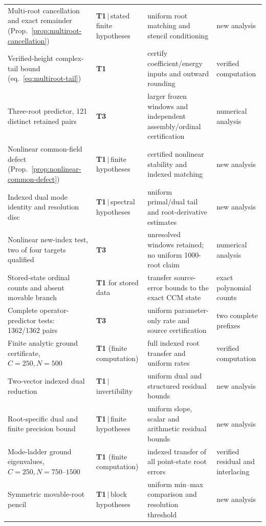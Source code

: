 \documentclass[11pt,a4paper]{article}
\begin{document}
{\begin{longtable}{@{}p{4.6cm} p{2.7cm} p{4.6cm} p{2.4cm}@{}}
Multi-root cancellation and exact remainder (Prop.~\ref{prop:multiroot-cancellation}) & \textbf{T1}$\,|\,$stated finite hypotheses & uniform root matching and stencil conditioning & new analysis \\
Verified-height complex-tail bound (eq.~\eqref{eq:multiroot-tail}) & \textbf{T1} & certify coefficient/energy inputs and outward rounding & verified computation \\
Three-root predictor, 121 distinct retained pairs & \textbf{T3} & larger frozen windows and independent assembly/ordinal certification & numerical analysis \\
Nonlinear common-field defect (Prop.~\ref{prop:nonlinear-common-defect}) & \textbf{T1}$\,|\,$finite hypotheses & certified nonlinear stability and indexed matching & new analysis \\
Indexed dual mode identity and resolution disc & \textbf{T1}$\,|\,$spectral hypotheses & uniform primal/dual tail and root-derivative estimates & new analysis \\
Nonlinear new-index test, two of four targets qualified & \textbf{T3} & unresolved windows retained; no uniform 1000-root claim & numerical analysis \\
Stored-state ordinal counts and absent movable branch & \textbf{T1} for stored data & transfer source-error bounds to the exact CCM state & exact polynomial counts \\
Complete operator-predictor tests: 1362/1362 pairs & \textbf{T3} & uniform parameter-only rate and source certification & two complete prefixes \\
Finite analytic ground certificate, $C=250,N=500$ & \textbf{T1} (finite computation) & full indexed root transfer and uniform rates & verified computation \\
Two-vector indexed dual reduction & \textbf{T1}$\,|\,$invertibility & uniform dual and structured residual bounds & new analysis \\
Root-specific dual and finite precision bound & \textbf{T1}$\,|\,$finite hypotheses & uniform slope, scalar and arithmetic residual bounds & new analysis \\
Mode-ladder ground eigenvalues, $C=250,N=750$--$1500$ & \textbf{T1} (finite computation) & indexed transfer of all point-state root errors & verified residual and interlacing \\
Symmetric movable-root pencil & \textbf{T1}$\,|\,$block hypotheses & uniform min--max comparison and resolution threshold & new analysis \\

\end{longtable}}
\end{document}
